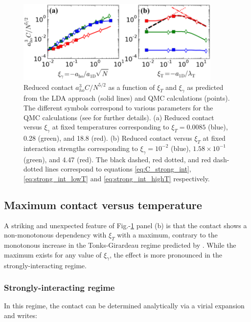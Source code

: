 \begin{figure}
    \centering
    \includegraphics[width=0.9\textwidth]{Fig/Chapter5/BS_LDA_vs_Bethe.PNG}
    \caption[Reduced contact $a_{ho}^3 C / N^{5/2}$ as a function of $\xi_T$ and $\xi_{\gamma}$ as predicted from the LDA approach and QMC calculations]{Reduced contact $a_{ho}^3 C / N^{5/2}$ as a function of $\xi_T$ and $\xi_{\gamma}$ as predicted from the LDA approach (solid lines) and QMC calculations (points). The different symbols correspond to various parameters for the QMC calculations (see \cite{yao2018tan} for further details). (a) Reduced contact versus $\xi_{\gamma}$ at fixed temperatures corresponding to $\xi_T = 0.0085$ (blue), 0.28 (green), and 18.8 (red). (b) Reduced contact versus $\xi_T$  at fixed interaction strengths corresponding to $\xi_\gamma = 10^{-2}$ (blue), $1.58 \times 10^{-1}$ (green), and 4.47 (red). The black dashed, red dotted, and red dash-dotted lines correspond to equations \ref{eq:C_strong_int}, \ref{eq:strong_int_lowT} and \ref{eq:strong_int_highT} respectively.}
    \label{fig:C_theo}
\end{figure}

\subsection{Maximum contact versus temperature}

A striking and unexpected feature of Fig.-\ref{fig:C_theo} panel (b) is that the contact shows a non-monotonous dependency with $\xi_T$ with a maximum, contrary to the monotonous increase in the Tonks-Girardeau regime predicted by \cite{vignolo2013universal}. While the maximum exists for any value of $\xi_{\gamma}$, the effect is more pronounced in the strongly-interacting regime. 

\subsubsection{Strongly-interacting regime}

In this regime, the contact can be determined analytically via a virial expansion \cite{vignolo2013universal} and writes:

